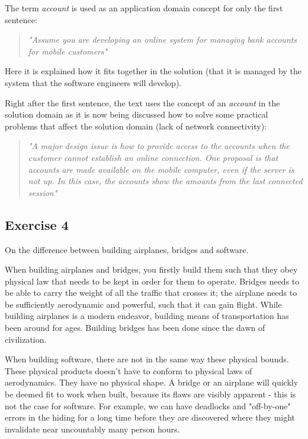 \documentclass[12pt,letterpaper]{article}
\begin{document}
The term \textit{account} is used as an application domain concept for only the first sentence:

\begin{quote}
  \textit{"Assume you are developing an online system for managing bank accounts for mobile customers"}
\end{quote}

Here it is explained how it fits together in the solution (that it is managed by the system that the
software engineers will develop).


Right after the first sentence, the text uses the concept of an \textit{account} in the solution domain
as it is now being discussed how to solve some practical problems that affect the solution domain (lack of network connectivity):

\begin{quote}
  \textit{"A major design issue is how to provide access to the accounts when the customer cannot establish an online connection. One proposal is that accounts are made available on the mobile computer, even if the server is not up. In this case, the accounts show the amounts from the last connected session"}
\end{quote}

\subsection{Exercise 4}

On the difference between building airplanes, bridges and software.

When building airplanes and bridges, you firstly build them such that they obey physical law that 
needs to be kept in order for them to operate. Bridges needs to be able to carry the weight of
all the traffic that crosses it; the airplane needs to be sufficiently aerodynamic and powerful, 
such that it can gain flight. While building airplanes is a modern endeavor, building
means of transportation has been around for ages. Building bridges has been done since the dawn
of civilization.

When building software, there are not in the same way these physical bounds. 
These physical products doesn't have to conform to physical laws of aerodynamics. They
have no physical shape. A bridge or an airplane will quickly be deemed fit to work when built,
because its flaws are visibly apparent - this is not the case for software. For example,
we can have deadlocks and "off-by-one" errors in the hiding for a long time before
they are discovered where they might invalidate near uncountably many person hours.
\end{document}
